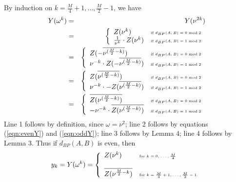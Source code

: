 By induction on $k=\frac{M}{4}+1,\ldots,\frac{M}{2}-1$, we have
\begin{eqnarray*}
Y(\omega^k)&=& Y(\nu^{2k})  \nonumber \\
&=& \left\{ \begin{array}{ll}
Z(\nu^{k}) &\mbox{\tiny if
$d_{BP}(A,B) = 0 \bmod 2$}\\
\frac{1}{\nu^{k}} \cdot Z(\nu^{k})
&\mbox{\tiny if
$d_{BP}(A,B) = 1 \bmod 2$}\\
\end{array} \right. \nonumber\\
&=& \left\{ \begin{array}{ll}
Z(- \overline{\nu^{(\frac{M}{2}-k)}}) &\mbox{\tiny if
$d_{BP}(A,B) = 0 \bmod 2$}\\
\nu^{-k} \cdot
Z(-\overline{\nu^{(\frac{M}{2}-k)}})
&\mbox{\tiny if
$d_{BP}(A,B) = 1 \bmod 2$}\\
\end{array} \right. \nonumber\\
&=& \left\{ \begin{array}{ll}
Z(\overline{\nu^{(\frac{M}{2}-k)}}) &\mbox{\tiny if
$d_{BP}(A,B) = 0 \bmod 2$}\\
\nu^{-k} \cdot
-Z(\overline{\nu^{(\frac{M}{2}-k)}})
&\mbox{\tiny if
$d_{BP}(A,B) = 1 \bmod 2$}\\
\end{array} \right.  \nonumber\\
&=& \left\{ \begin{array}{ll}
\overline{Z(\nu^{(\frac{M}{2}-k)})} &\mbox{\tiny if
$d_{BP}(A,B) = 0 \bmod 2$}\\
-\nu^{-k} \cdot
\overline{Z(\nu^{(\frac{M}{2}-k)})}
&\mbox{\tiny if
$d_{BP}(A,B) = 1 \bmod 2$}\\
\end{array} \right.  \nonumber\\
\end{eqnarray*}
Line 1 follows by definition, since $\omega=\nu^2$;
line 2 follows by equations (\ref{eqn:evenY}) and
(\ref{eqn:oddY});
line 3 follows by Lemma 4;
line 4 follows by Lemma 3.
Thus if $d_{BP}(A,B)$ is even, then
\begin{eqnarray}
\label{eqn:trickyRootsOfUnity1}
y_k = Y(\omega^k) = \left\{
\begin{array}{ll}
Z(\nu^k) &\mbox{\tiny for $k=0,\ldots,\frac{M}{4}$}\\
\quad & \quad\\
\overline{Z(\nu^{\frac{M}{2}-k})} &\mbox{\tiny for $k=\frac{M}{4}+1,\ldots,\frac{M}{2}-1$.}\\
\end{array} \right.
\end{eqnarray}
